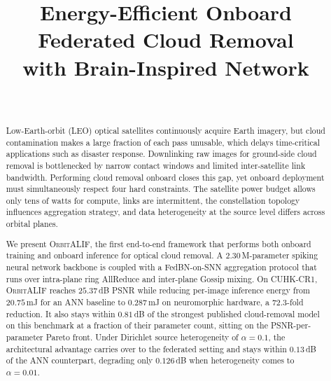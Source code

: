 \documentclass[conference]{IEEEtran}
\newcommand{\OrbitALIF}{\textsc{OrbitALIF}}
\begin{document}
\title{Energy-Efficient Onboard Federated Cloud Removal\\
       with Brain-Inspired Network}

\author{
  \\
}

\maketitle

\begin{abstract}
Low-Earth-orbit (LEO) optical satellites continuously acquire Earth
imagery, but cloud contamination makes a large fraction of each pass
unusable, which delays time-critical applications such as disaster
response. Downlinking raw images for ground-side cloud removal is
bottlenecked by narrow contact windows and limited inter-satellite
link bandwidth. Performing cloud removal onboard closes this gap, yet
onboard deployment must simultaneously respect four hard constraints.
The satellite power budget allows only tens of watts for compute,
links are intermittent, the constellation topology influences
aggregation strategy, and data heterogeneity at the source level
differs across orbital planes.

We present \OrbitALIF{}, the first end-to-end framework that performs
both onboard training and onboard inference for optical cloud removal.
A $2.30$\,M-parameter spiking neural network backbone is coupled with
a FedBN-on-SNN aggregation protocol that runs over intra-plane ring
AllReduce and inter-plane Gossip mixing. On CUHK-CR1, \OrbitALIF{}
reaches $25.37$\,dB PSNR while reducing per-image inference energy
from $20.75$\,mJ for an ANN baseline to $0.287$\,mJ on neuromorphic
hardware, a $72.3$-fold reduction. It also stays within $0.81$\,dB
of the strongest published cloud-removal model on this benchmark at
a fraction of their parameter count, sitting on the
PSNR-per-parameter Pareto front. Under Dirichlet source
heterogeneity of $\alpha\!=\!0.1$, the architectural advantage
carries over to the federated setting and stays within $0.13$\,dB of
the ANN counterpart, degrading only $0.126$\,dB when heterogeneity
comes to $\alpha\!=\!0.01$.
\end{abstract}
\end{document}

